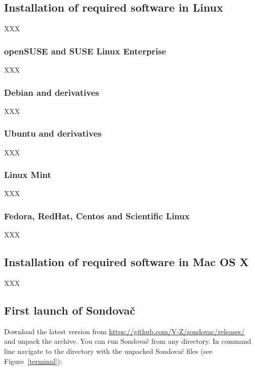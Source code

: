 \documentclass[a4paper, 11pt, twoside]{article}
\begin{document}
\subsection{Installation of required software in Linux}

XXX

\subsubsection{openSUSE and SUSE Linux Enterprise}

XXX

\subsubsection{Debian and derivatives}

XXX

\subsubsection{Ubuntu and derivatives}

XXX

\subsubsection{Linux Mint}

XXX

\subsubsection{Fedora, RedHat, Centos and Scientific Linux}

XXX

\subsection{Installation of required software in Mac OS X}

XXX

\subsection{First launch of Sondovač}
\label{script-start}

Download the latest version from \href{https://github.com/V-Z/sondovac/releases/}{https://github.com/V-Z/sondovac/releases/} and unpack the archive. You can run Sondovač from any directory. In command line navigate to the directory with the unpacked Sondovač files (see Figure~\ref{terminal}):
\end{document}
